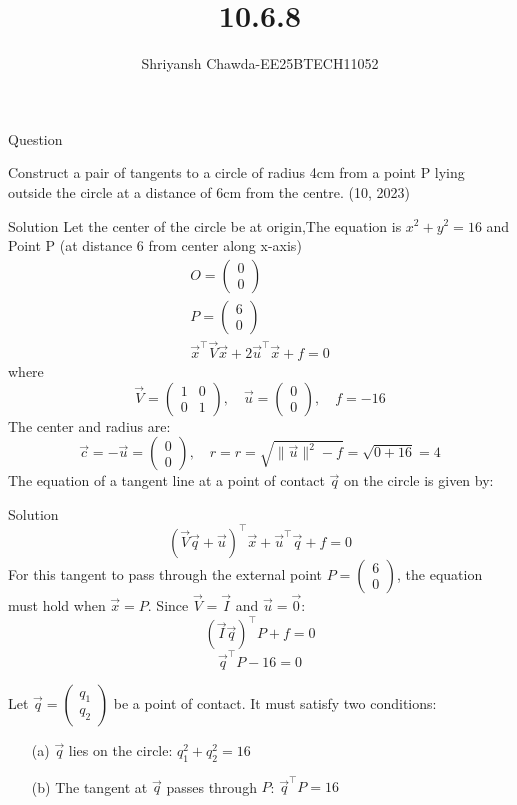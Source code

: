 \documentclass{beamer}
\title{10.6.8}
\author{Shriyansh Chawda-EE25BTECH11052}
\newcommand{\myvec}[1]{\ensuremath{\begin{pmatrix}#1\end{pmatrix}}}
\providecommand{\brak}[1]{\ensuremath{\left(#1\right)}}
\begin{document}
	

		\frame{\titlepage}
	
	
\begin{frame}{Question} 

Construct a pair of tangents to a circle of radius 4cm from a point P lying outside the circle at 
a distance of 6cm from the centre.
\hfill{(10, 2023)}\\
\end{frame}
	\begin{frame}{Solution}
	Let the center of the circle be at origin,The equation is $x^2 + y^2 = 16$ and Point P (at distance 6 from center along x-axis) 
\begin{align}
	O = \myvec{0\\0}\\
	P = \myvec{6\\0} \\
	\vec{x}^\top \vec{V} \vec{x} + 2\vec{u}^\top \vec{x} + f = 0
\end{align}
where
\begin{equation}
	\vec{V} = \myvec{1 & 0\\0 & 1}, \quad \vec{u} = \myvec{0\\0}, \quad f = -16
\end{equation}
The center and radius are:
\begin{equation}
	\vec{c} = -\vec{u} = \myvec{0\\0}, \quad
	r = r = \sqrt{\lVert \vec{u} \rVert^2 - f} = \sqrt{0 + 16} = 4
\end{equation}
The equation of a tangent line at a point of contact $\vec{q}$ on the circle is given by:
\end{frame}



\begin{frame}{Solution}
	\begin{equation}
	\brak{\vec{V}\vec{q} + \vec{u}}^\top \vec{x} + \vec{u}^\top \vec{q} + f = 0
\end{equation}
For this tangent to pass through the external point $P = \myvec{6\\0}$, the equation must hold when $\vec{x}=P$. Since $\vec{V}=\vec{I}$ and $\vec{u}=\vec{0}$:
\begin{equation}
	\brak{\vec{I}\vec{q}}^\top P + f = 0
\end{equation}
\begin{equation}
	\vec{q}^\top P - 16 = 0
\end{equation}

Let $\vec{q} = \myvec{q_1\\q_2}$ be a point of contact. It must satisfy two conditions:
\begin{enumerate}
	\item[(a)] $\vec{q}$ lies on the circle: $q_1^2 + q_2^2 = 16$
	\item[(b)] The tangent at $\vec{q}$ passes through $P$: $\vec{q}^\top P = 16$
\end{enumerate}
\end{frame}
\end{document}
